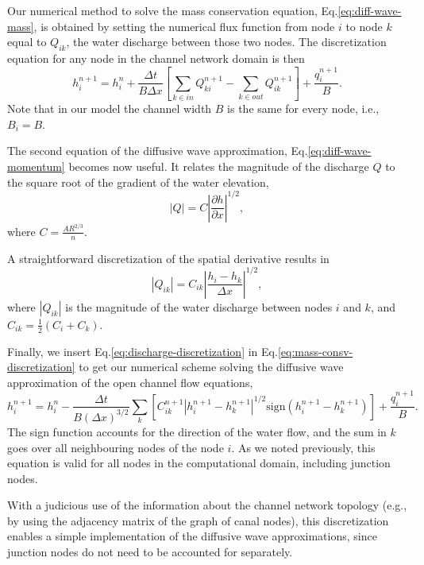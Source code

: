 \documentclass[bg, manuscript]{copernicus}
\begin{document}
Our numerical method to solve the mass conservation equation, Eq.\eqref{eq:diff-wave-mass}, is obtained by setting the numerical flux function from node $i$ to node $k$ equal to $Q_{ik}$, the water discharge between those two nodes.
The discretization equation for any node in the channel network domain is then
\begin{equation} \label{eq:mass-consv-discretization}
h_i^{n+1} = h_i^{n} + \frac{\Delta t}{B\Delta x }\left[ \sum_{k\in in} Q_{ki}^{n+1} - \sum_{k \in out}Q_{ik}^{n+1}\right] + \frac{q_i^{n+1}}{B}.
\end{equation}
Note that in our model the channel width $B$ is the same for every node, i.e., $B_i = B$.

The second equation of the diffusive wave approximation, Eq.\eqref{eq:diff-wave-momentum}  becomes now useful.
It relates the magnitude of the discharge $Q$ to the square root of the gradient of the water elevation,
\begin{equation} \label{}
|Q| = C\left|\frac{\partial h}{\partial x}\right|^{1/2},
\end{equation}
where $C=\frac{A R^{2/3}}{n}$.

A straightforward discretization of the spatial derivative results in 
\begin{equation} \label{eq:discharge-discretization}
|Q_{ik}| = C_{ik}\left|\frac{h_i - h_k}{\Delta x}\right|^{1/2},
\end{equation}
where $|Q_{ik}|$ is the magnitude of the water discharge between nodes $i$ and $k$, and $C_{ik} = \frac{1}{2}\left(C_i + C_k\right)$.

Finally, we insert Eq.\eqref{eq:discharge-discretization} in Eq.\eqref{eq:mass-consv-discretization} to get our numerical scheme solving the diffusive wave approximation of the open channel flow equations,
\begin{equation} \label{eq:openchannelflow-final-discretization}
h_i^{n+1} = h_i^n - \frac{\Delta t}{B(\Delta x)^{3/2}}\sum_k\left[C_{ik}^{n+1}|h_i^{n+1} - h_k^{n+1}|^{1/2} \text{sign}(h_i^{n+1} - h_k^{n+1})\right] + \frac{q_i^{n+1}}{B}.
\end{equation}
The sign function accounts for the direction of the water flow, and the sum in $k$ goes over all neighbouring nodes of the node $i$. 
As we noted previously, this equation is valid for all nodes in the computational domain, including junction nodes.

With a judicious use of the information about the channel network topology (e.g., by using the adjacency matrix of the graph of canal nodes), this discretization enables a simple implementation of the diffusive wave approximations, since junction nodes do not need to be accounted for separately.
\end{document}
